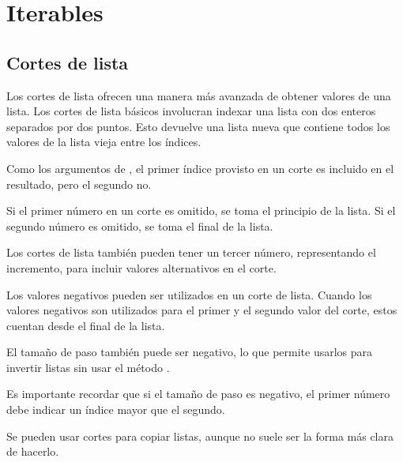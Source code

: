 \chapter{Iterables}


\section{Cortes de lista}

Los cortes de lista ofrecen una manera más avanzada de obtener valores de una lista.
Los cortes de lista básicos involucran indexar una lista con dos enteros separados por dos puntos.
Esto devuelve una lista nueva que contiene todos los valores de la lista vieja entre los índices.


Como los argumentos de , el primer índice provisto en un corte es incluido en el resultado, pero el segundo no.

Si el primer número en un corte es omitido, se toma el principio de la lista.
Si el segundo número es omitido, se toma el final de la lista.


Los cortes de lista también pueden tener un tercer número, representando el incremento, para incluir valores alternativos en el corte.


Los valores negativos pueden ser utilizados en un corte de lista.
Cuando los valores negativos son utilizados para el primer y el segundo valor del corte, estos cuentan desde el final de la lista.


El tamaño de paso también puede ser negativo, lo que permite usarlos para invertir listas sin usar el método .


Es importante recordar que si el tamaño de paso es negativo, el primer número debe indicar un índice mayor que el segundo.

Se pueden usar cortes para copiar listas, aunque no suele ser la forma más clara de hacerlo.

